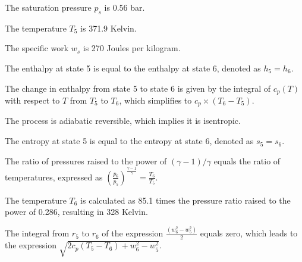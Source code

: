 The saturation pressure \( p_s \) is 0.56 bar.

The temperature \( T_5 \) is 371.9 Kelvin.

The specific work \( w_s \) is 270 Joules per kilogram.

The enthalpy at state 5 is equal to the enthalpy at state 6, denoted as \( h_5 = h_6 \).

The change in enthalpy from state 5 to state 6 is given by the integral of \( c_p(T) \) with respect to \( T \) from \( T_5 \) to \( T_6 \), which simplifies to \( c_p \times (T_6 - T_5) \).

The process is adiabatic reversible, which implies it is isentropic.

The entropy at state 5 is equal to the entropy at state 6, denoted as \( s_5 = s_6 \).

The ratio of pressures raised to the power of \((\gamma - 1)/\gamma\) equals the ratio of temperatures, expressed as \( \left( \frac{p_6}{p_5} \right)^{\frac{\gamma - 1}{\gamma}} = \frac{T_6}{T_5} \).

The temperature \( T_6 \) is calculated as 85.1 times the pressure ratio raised to the power of 0.286, resulting in 328 Kelvin.

The integral from \( r_5 \) to \( r_6 \) of the expression \(\frac{(w_6^2 - w_5^2)}{2}\) equals zero, which leads to the expression \( \sqrt{2 c_p (T_5 - T_6) + w_6^2 - w_5^2} \).
